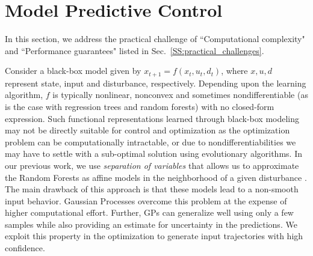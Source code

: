 \section{Model Predictive Control}
\label{S:dpc}

In this section, we address the practical challenge of ``Computational complexity" and ``Performance guarantees" listed in Sec.~\ref{SS:practical_challenges}.

Consider a black-box model given by $x_{t+1}=f(x_t,u_t,d_t)$, where $x,u,d$ represent state, input and disturbance, respectively. Depending upon the learning algorithm, $f$ is typically nonlinear, nonconvex and sometimes nondifferentiable (as is the case with regression trees and random forests) with no closed-form expression. 
Such functional representations learned through black-box modeling may not be directly suitable for control and optimization as the optimization problem can be computationally intractable, or due to nondifferentiabilities we may have to settle with a sub-optimal solution using evolutionary algorithms. 
In our previous work, we use \textit{separation of variables} that allows us to approximate the Random Forests as affine models in the neighborhood of a given disturbance \cite{JainACC2017,JainCDC2017}. 
The main drawback of this approach is that these models lead to a non-smooth input behavior. 
Gaussian Processes overcome this problem at the expense of higher computational effort.
Further, GPs can generalize well using only a few samples while also providing an estimate for uncertainty in the predictions. 
We exploit this property in the optimization to generate input trajectories with high confidence.

